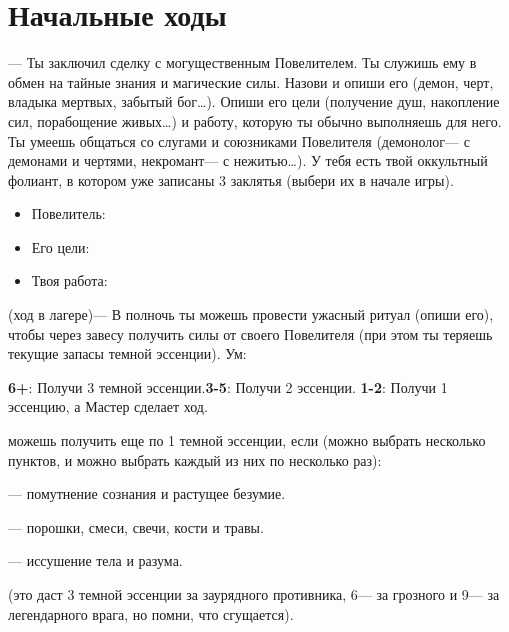 \documentclass[10pt,twoside]{report}
\begin{document}
\section*{Начальные ходы}
\begin{description}[noitemsep]
\item[Сделка с Тьмой]--- Ты заключил сделку с могущественным Повелителем. Ты
служишь ему в обмен на тайные знания и магические силы. Назови и опиши
его (демон, черт, владыка мертвых, забытый бог\ldots). Опиши его цели
(получение душ, накопление сил, порабощение живых\ldots) и работу,
которую ты обычно выполняешь для него. Ты умеешь общаться со слугами и
союзниками Повелителя (демонолог--- с демонами и чертями, некромант--- с
нежитью\ldots). У тебя есть твой оккультный фолиант, в котором уже
записаны 3 заклятья (выбери их в начале игры).
\begin{itemize}[noitemsep]
\item Повелитель:
\item Его цели:
\item Твоя работа:
\end{itemize}
\vfill
\pagebreak

\item[Жуткий Ритуал] (ход в лагере)--- В полночь ты можешь провести
  ужасный ритуал (опиши его), чтобы через завесу получить силы от своего
Повелителя (при этом ты теряешь текущие запасы темной эссенции). { Ум:}

 \textbf{6+}: Получи 3 темной эссенции.\textbf{3-5}: Получи 2 эссенции.  \textbf{1-2}: Получи 1 эссенцию, а Мастер сделает ход.

{ можешь получить еще по 1 темной эссенции, если} (можно выбрать
несколько пунктов, и можно выбрать каждый из них по несколько раз):

\begin{description}[noitemsep]
\item[Потратить 1 Волю]--- помутнение сознания и растущее безумие.
\item[Потратить 1 Запас]--- порошки, смеси, свечи, кости и травы.
\item[Получить травму]--- иссушение тела и разума.

\item[Принести жертву] (это даст 3 темной эссенции за заурядного
  противника, 6--- за грозного и 9--- за легендарного врага, но помни,
  что { сгущается}).

\end{description}
\vfill
\pagebreak


\end{description}
\end{document}
